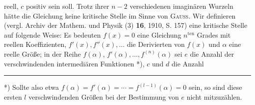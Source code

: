 {reell, $c$ positiv sein soll. Trotz ihrer $n-2$ verschiedenen imaginären Wurzeln hätte die Gleichung keine
kritische Stelle im Sinne von \textsc{Gauss}. Wir definieren (vergl. Archiv der Mathem. und Physik (3) \textbf{16}, 1910,
S. 157) eine kritische Stelle auf folgende Weise: Es bedeuten $f(x)=0$ eine Gleichung $n^{\mathrm{ten}}$ Grades mit
reellen Koeffizienten, $f'(x),f''(x),\ldots$ die Derivierten von $f(x)$ und $\alpha$ eine reelle Größe; in der Reihe $f(\alpha)$,
$f'(\alpha),\ldots,f^{(n)}(\alpha)$ sei $e$ die Anzahl der verschwindenden intermediären Funktionen *), $c$ und $d$ die Anzahl
\par\smallskip\noindent\rule{.25\linewidth}{.4pt}\par\smallskip
\noindent\hspace*{\parindent}*) Sollte also etwa $f(\alpha)=f'(\alpha)=\cdots=f^{(l-1)}(\alpha)=0$ sein, so sind diese ersten $l$ verschwindenden
Größen bei der Bestimmung von $e$ nicht mitzuzählen.
\par}
\clearpage
{}
